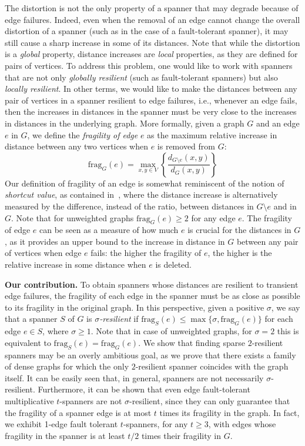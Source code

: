 \documentclass{article}
\newcommand{\dist}          {d}
\newcommand{\frag}          {\mathrm{frag}}
\begin{document}
The distortion is not the only property of a spanner that may degrade because of edge failures. Indeed, even when the removal of an edge cannot change the overall distortion of a spanner (such as in the case of a fault-tolerant spanner),  
it may still cause a sharp increase in some of its distances. Note that while the distortion is a \emph{global} property, distance increases are \emph{local} properties, as they are defined for pairs of vertices.
To address this problem, one would like to work with spanners that are not only \emph{globally resilient} (such as fault-tolerant spanners) but also \emph{locally resilient}. In other terms, we would like to make the 
distances between any pair of vertices in a spanner resilient to edge failures, i.e., whenever an edge fails, then the increases in distances in the spanner must be very close to the increases in distances in the underlying graph.
More formally, given a graph $G$ and an edge $e$ in $G$,
we define the \emph{fragility of edge} $e$ as the maximum relative increase in distance 
between any two vertices when $e$ is removed from $G$:
$$\frag_G(e) = \max_{x,y \in V} \left\{ \frac{\dist_{G\setminus e}(x,y)}{\dist_{G}(x,y)}\right\}$$
Our definition of fragility of an edge is somewhat reminiscent of the notion of \emph{shortcut value}, as contained in~\cite{Dagstuhl3}, where the distance increase is alternatively measured by the difference, instead of the ratio, between distances in $G\setminus e$ and in $G$. 
Note that for unweighted graphs
$\frag_G(e) \geq 2$ for any edge $e$.
The fragility of edge $e$ can be seen as a measure of how much $e$ is crucial for 
the distances in $G$, as it provides an upper bound to the increase in distance in $G$ between any pair of vertices when edge $e$ fails: the higher the fragility of $e$, the higher is the relative increase in some distance when $e$ is deleted. 

\vspace{0.3cm}
\noindent\textbf{Our contribution.}
To obtain spanners whose distances are resilient to transient edge failures, 
 the fragility of each edge in the spanner must be as close as possible to its fragility in the original graph. In this perspective, given a positive $\sigma$, we say that a spanner $S$ of $G$ is \emph{$\sigma$-resilient} if $\frag_S(e) \leq \max\{\sigma, \frag_G(e)\}$ for each edge $e \in S$, where $\sigma \geq 1$.
 Note that in case of unweighted graphs, for $\sigma=2$ this is equivalent to $\frag_S(e) = \frag_G(e)$.
 We show that finding sparse $2$-resilient spanners may be an overly ambitious goal, as we prove that there exists a family of dense graphs for which the only $2$-resilient spanner coincides with the graph itself.
It can be easily seen that, in general, spanners are not necessarily $\sigma$-resilient.
Furthermore, it can be shown that even
edge fault-tolerant multiplicative $t$-spanners are not $\sigma$-resilient, since they can only guarantee that the fragility of a spanner edge is at most $t$ times its fragility in the graph. In fact, we exhibit 1-edge fault tolerant $t$-spanners, for any $t \geq 3$, with edges whose fragility in the spanner is at least $t/2$ times their fragility in $G$.
\end{document}
